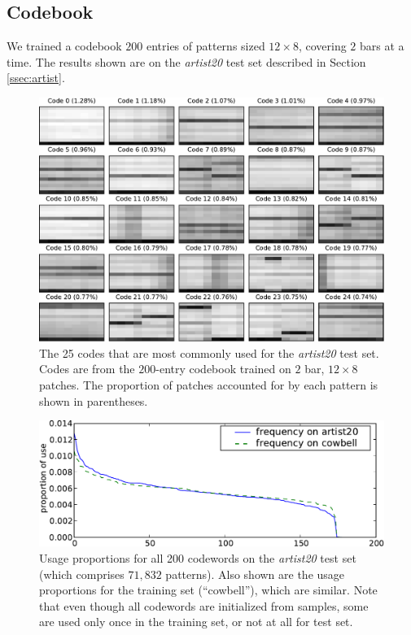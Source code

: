 \documentclass{article}
\begin{document}
\subsection{Codebook}\label{sec:codebook}

We trained a codebook $200$ entries of patterns sized $12\times8$, covering
$2$ bars at a time.  The results shown are on the {\it artist20} test set described in 
Section \ref{ssec:artist}.


\begin{figure}[t]
\begin{center}
\includegraphics[width=\columnwidth]{codes1}
\end{center}
\caption{\small{
The 25 codes that are 
most commonly used for the {\it artist20} test set. 
Codes are from the $200$-entry codebook trained on $2$ bar, $12 \times 8$
patches.  The proportion of patches accounted for by each pattern is shown 
in parentheses.
}}
\label{fig:codes1}
\end{figure}

\begin{figure}[bt]
\begin{center}
\includegraphics[width=.99\columnwidth]{freqs}
\end{center}
\caption{\small{Usage proportions for all 200 codewords 
on the {\it artist20} test set (which comprises $71,832$
patterns).  Also shown are the usage proportions for the training set (``cowbell''), 
which are similar.
Note that even though all codewords are initialized from samples, some
are used only once in the training set, or not at all for test set.
}}
\label{fig:freqs}
\end{figure}
\end{document}
